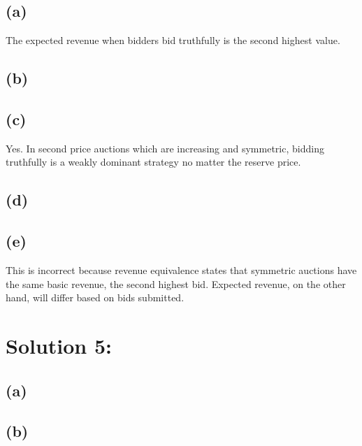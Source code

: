 \documentclass[10pt,a4paper]{article}
\begin{document}
  \subsection*{(a)}
    The expected revenue when bidders bid truthfully is the second highest value.
  \subsection*{(b)}
  \subsection*{(c)}
    Yes. In second price auctions which are increasing and symmetric, bidding truthfully is a weakly dominant strategy no matter the reserve price.
  \subsection*{(d)}
  \subsection*{(e)}
    This is incorrect because revenue equivalence states that symmetric auctions have the same basic revenue, the second highest bid. Expected revenue, on the other hand, will differ based on bids submitted.
\section*{Solution 5:}
  \subsection*{(a)}
  \subsection*{(b)}
\end{document}
